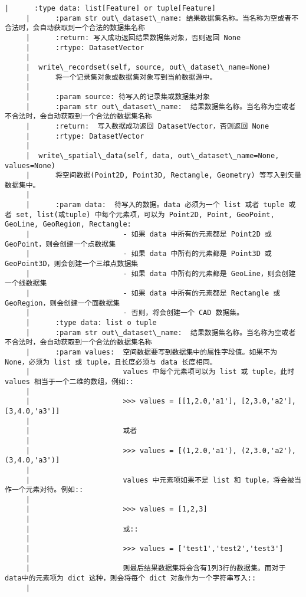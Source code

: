 \documentclass[11pt]{article}
\begin{document}
\begin{Verbatim}[commandchars=\\\{\}]
     |      :type data: list[Feature] or tuple[Feature]
     |      :param str out\_dataset\_name: 结果数据集名称。当名称为空或者不合法时，会自动获取到一个合法的数据集名称
     |      :return: 写入成功返回结果数据集对象，否则返回 None
     |      :rtype: DatasetVector
     |  
     |  write\_recordset(self, source, out\_dataset\_name=None)
     |      将一个记录集对象或数据集对象写到当前数据源中。
     |      
     |      :param source: 待写入的记录集或数据集对象
     |      :param str out\_dataset\_name:  结果数据集名称。当名称为空或者不合法时，会自动获取到一个合法的数据集名称
     |      :return:  写入数据成功返回 DatasetVector，否则返回 None
     |      :rtype: DatasetVector
     |  
     |  write\_spatial\_data(self, data, out\_dataset\_name=None, values=None)
     |      将空间数据(Point2D, Point3D, Rectangle, Geometry) 等写入到矢量数据集中。
     |      
     |      :param data:  待写入的数据。data 必须为一个 list 或者 tuple 或者 set, list(或tuple) 中每个元素项，可以为 Point2D, Point, GeoPoint, GeoLine, GeoRegion, Rectangle:
     |                      - 如果 data 中所有的元素都是 Point2D 或 GeoPoint，则会创建一个点数据集
     |                      - 如果 data 中所有的元素都是 Point3D 或 GeoPoint3D，则会创建一个三维点数据集
     |                      - 如果 data 中所有的元素都是 GeoLine，则会创建一个线数据集
     |                      - 如果 data 中所有的元素都是 Rectangle 或 GeoRegion，则会创建一个面数据集
     |                      - 否则，将会创建一个 CAD 数据集。
     |      :type data: list o tuple
     |      :param str out\_dataset\_name:  结果数据集名称。当名称为空或者不合法时，会自动获取到一个合法的数据集名称
     |      :param values:  空间数据要写到数据集中的属性字段值。如果不为 None，必须为 list 或 tuple，且长度必须与 data 长度相同。
     |                      values 中每个元素项可以为 list 或 tuple，此时 values 相当于一个二维的数组，例如::
     |      
     |                      >>> values = [[1,2.0,'a1'], [2,3.0,'a2'], [3,4.0,'a3']]
     |      
     |                      或者
     |      
     |                      >>> values = [(1,2.0,'a1'), (2,3.0,'a2'), (3,4.0,'a3')]
     |      
     |                      values 中元素项如果不是 list 和 tuple，将会被当作一个元素对待。例如::
     |      
     |                      >>> values = [1,2,3]
     |      
     |                      或::
     |      
     |                      >>> values = ['test1','test2','test3']
     |      
     |                      则最后结果数据集将会含有1列3行的数据集。而对于data中的元素项为 dict 这种，则会将每个 dict 对象作为一个字符串写入::
     |      

\end{Verbatim}
\end{document}
